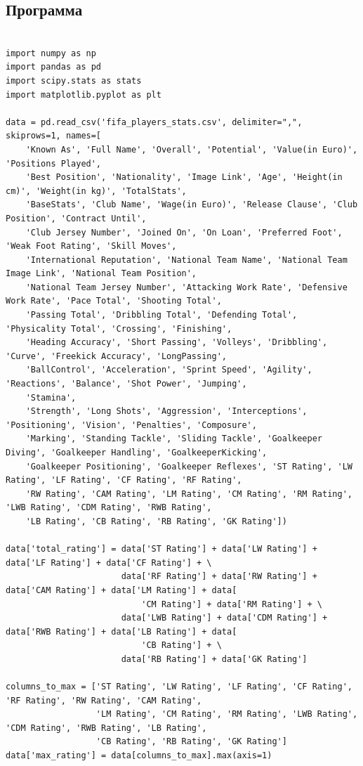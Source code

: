 \documentclass{article}
\begin{document}
\subsection{Программа}\label{subsec:2}
\begin{verbatim}

import numpy as np
import pandas as pd
import scipy.stats as stats
import matplotlib.pyplot as plt

data = pd.read_csv('fifa_players_stats.csv', delimiter=",", skiprows=1, names=[
    'Known As', 'Full Name', 'Overall', 'Potential', 'Value(in Euro)', 'Positions Played',
    'Best Position', 'Nationality', 'Image Link', 'Age', 'Height(in cm)', 'Weight(in kg)', 'TotalStats',
    'BaseStats', 'Club Name', 'Wage(in Euro)', 'Release Clause', 'Club Position', 'Contract Until',
    'Club Jersey Number', 'Joined On', 'On Loan', 'Preferred Foot', 'Weak Foot Rating', 'Skill Moves',
    'International Reputation', 'National Team Name', 'National Team Image Link', 'National Team Position',
    'National Team Jersey Number', 'Attacking Work Rate', 'Defensive Work Rate', 'Pace Total', 'Shooting Total',
    'Passing Total', 'Dribbling Total', 'Defending Total', 'Physicality Total', 'Crossing', 'Finishing',
    'Heading Accuracy', 'Short Passing', 'Volleys', 'Dribbling', 'Curve', 'Freekick Accuracy', 'LongPassing',
    'BallControl', 'Acceleration', 'Sprint Speed', 'Agility', 'Reactions', 'Balance', 'Shot Power', 'Jumping',
    'Stamina',
    'Strength', 'Long Shots', 'Aggression', 'Interceptions', 'Positioning', 'Vision', 'Penalties', 'Composure',
    'Marking', 'Standing Tackle', 'Sliding Tackle', 'Goalkeeper Diving', 'Goalkeeper Handling', 'GoalkeeperKicking',
    'Goalkeeper Positioning', 'Goalkeeper Reflexes', 'ST Rating', 'LW Rating', 'LF Rating', 'CF Rating', 'RF Rating',
    'RW Rating', 'CAM Rating', 'LM Rating', 'CM Rating', 'RM Rating', 'LWB Rating', 'CDM Rating', 'RWB Rating',
    'LB Rating', 'CB Rating', 'RB Rating', 'GK Rating'])

data['total_rating'] = data['ST Rating'] + data['LW Rating'] + data['LF Rating'] + data['CF Rating'] + \
                       data['RF Rating'] + data['RW Rating'] + data['CAM Rating'] + data['LM Rating'] + data[
                           'CM Rating'] + data['RM Rating'] + \
                       data['LWB Rating'] + data['CDM Rating'] + data['RWB Rating'] + data['LB Rating'] + data[
                           'CB Rating'] + \
                       data['RB Rating'] + data['GK Rating']

columns_to_max = ['ST Rating', 'LW Rating', 'LF Rating', 'CF Rating', 'RF Rating', 'RW Rating', 'CAM Rating',
                  'LM Rating', 'CM Rating', 'RM Rating', 'LWB Rating', 'CDM Rating', 'RWB Rating', 'LB Rating',
                  'CB Rating', 'RB Rating', 'GK Rating']
data['max_rating'] = data[columns_to_max].max(axis=1)


\end{verbatim}
\end{document}
